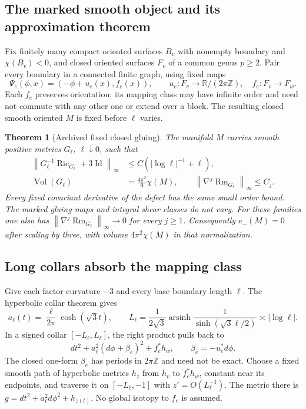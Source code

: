 \documentclass[a4paper,11pt]{article}
\newtheorem{theorem}{Theorem}[section]
\theoremstyle{definition}
\DeclareMathOperator{\Ric}{Ric}\DeclareMathOperator{\Rm}{Rm}
\DeclareMathOperator{\Vol}{Vol}\DeclareMathOperator{\tr}{tr}
\DeclareMathOperator{\Id}{Id}\DeclareMathOperator{\Div}{div}
\DeclareMathOperator{\arsinh}{arsinh}\DeclareMathOperator{\TT}{TT}
\newcommand{\R}{\mathbb R}\newcommand{\Z}{\mathbb Z}
\newcommand{\norm}[1]{\left\lVert#1\right\rVert}
\begin{document}
\subsection{The marked smooth object and its approximation theorem}
\label{sec:sheared-theorem}
Fix finitely many compact oriented surfaces $B_v$ with nonempty boundary
and $\chi(B_v)<0$, and closed oriented surfaces $F_v$ of a common genus
$p\ge2$. Pair every boundary in a connected finite graph, using fixed maps
\begin{equation}\label{eq:gluing}
\Psi_e(\phi,x)=(-\phi+u_e(x),f_e(x)),\qquad
u_e:F_v\to\R/(2\pi\Z),\quad f_e:F_v\to F_w.
\end{equation}
Each $f_e$ preserves orientation; its mapping class may have infinite
order and need not commute with any other one or extend over a block.
The resulting closed smooth oriented $M$ is fixed before $\ell$ varies.

\begin{theorem}[Archived fixed closed gluing]\label{thm:sheared}
The manifold $M$ carries smooth positive metrics $G_\ell$, $\ell\downarrow0$,
such that
\begin{align}
\norm{G_\ell^{-1}\Ric_{G_\ell}+3\Id}_\infty
 &\le C(|\log\ell|^{-1}+\ell),\label{eq:sheared-bound}\\
\Vol(G_\ell)&=\frac{4\pi^2}{9}\chi(M),\qquad
\norm{\nabla^j\Rm_{G_\ell}}_\infty\le C_j .
\end{align}
Every fixed covariant derivative of the defect has the same small
order bound. The marked gluing maps and integral shear classes do not
vary. For these families one also has
$\norm{\nabla^j\Rm_{G_\ell}}_\infty\to0$ for every $j\ge1$.
Consequently $e_-(M)=0$ after scaling by three, with volume
$4\pi^2\chi(M)$ in that normalization.
\end{theorem}

\subsection{Long collars absorb the mapping class}\label{sec:path-blocks}
Give each factor curvature $-3$ and every base boundary length $\ell$.
The hyperbolic collar theorem \cite{Rupflin} gives
\[
a_\ell(t)=\frac{\ell}{2\pi}\cosh(\sqrt3t),\qquad
L_\ell=\frac1{2\sqrt3}\arsinh
           \frac1{\sinh(\sqrt3\ell/2)}\asymp|\log\ell|.
\]
In a signed collar $[-L_\ell,L_\ell]$, the right product pulls back to
\[
dt^2+a_\ell^2(d\phi+\beta_e)^2+f_e^*h_w,\qquad
\beta_e=-u_e^*d\phi .
\]
The closed one-form $\beta_e$ has periods in $2\pi\Z$ and need not be exact.
Choose a fixed smooth path of hyperbolic metrics $h_z$ from $h_v$
to $f_e^*h_w$, constant near its endpoints, and traverse it on
$[-L_\ell,-1]$ with $z'=O(L_\ell^{-1})$. The metric there is
$g=dt^2+a_\ell^2d\phi^2+h_{z(t)}$. No global isotopy to $f_e$ is assumed.
\end{document}

